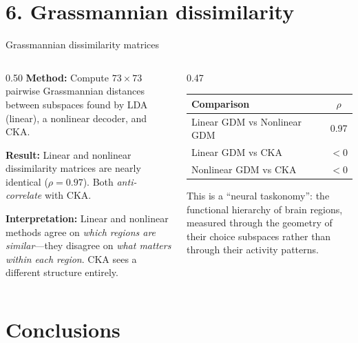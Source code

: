 \documentclass[aspectratio=169,11pt]{beamer}
\begin{document}
\section{6. Grassmannian dissimilarity}

\begin{frame}{Grassmannian dissimilarity matrices}
\begin{columns}[T]
\begin{column}{0.50\textwidth}
\textbf{Method:} Compute $73 \times 73$ pairwise Grassmannian distances between subspaces found by LDA (linear), a nonlinear decoder, and CKA.

\vspace{0.5em}
\textbf{Result:} Linear and nonlinear dissimilarity matrices are nearly identical ($\rho = 0.97$). Both \emph{anti-correlate} with CKA.

\vspace{0.5em}
\textbf{Interpretation:} Linear and nonlinear methods agree on \emph{which regions are similar}---they disagree on \emph{what matters within each region}. CKA sees a different structure entirely.
\end{column}

\begin{column}{0.47\textwidth}
\vspace{0.5em}
{\small
\begin{tabular}{lc}
\toprule
\textbf{Comparison} & \textbf{$\rho$} \\
\midrule
Linear GDM vs Nonlinear GDM & 0.97 \\
Linear GDM vs CKA & $< 0$ \\
Nonlinear GDM vs CKA & $< 0$ \\
\bottomrule
\end{tabular}
}

\vspace{0.8em}
{\small This is a ``neural taskonomy'': the functional hierarchy of brain regions, measured through the geometry of their choice subspaces rather than through their activity patterns.}
\end{column}
\end{columns}
\end{frame}

\section{Conclusions}
\end{document}
